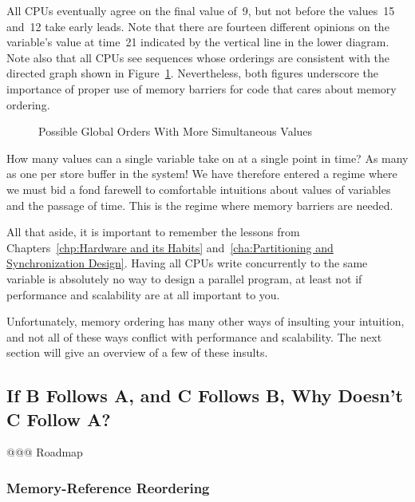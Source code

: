 All CPUs eventually agree on the final value of~9, but not before
the values~15 and~12 take early leads.
Note that there are fourteen different opinions on the variable's value
at time~21 indicated by the vertical line in the lower diagram.
Note also that all CPUs see sequences whose orderings are consistent with
the directed graph shown in
Figure~\ref{fig:advsync:Possible Global Orders With More Simultaneous Values}.
Nevertheless, both figures underscore the importance of
proper use of memory barriers for code that cares about memory ordering.

\begin{figure}[htb]
\centering
{}
\caption{Possible Global Orders With More Simultaneous Values}
\label{fig:advsync:Possible Global Orders With More Simultaneous Values}
\end{figure}

How many values can a single variable take on at a single point in
time?
As many as one per store buffer in the system!
We have therefore entered a regime where we must bid a fond farewell to
comfortable intuitions about values of variables and the passage of time.
This is the regime where memory barriers are needed.

All that aside, it is important to remember the lessons from
Chapters~\ref{chp:Hardware and its Habits}
and~\ref{cha:Partitioning and Synchronization Design}.
Having all CPUs write concurrently to the same variable
is absolutely no way to design a parallel program, at least
not if performance and scalability are at all important to you.

Unfortunately, memory ordering has many other ways of insulting your
intuition, and not all of these ways conflict with performance and
scalability.
The next section will give an overview of a few of these insults.

\subsection{If B Follows A, and C Follows B, Why Doesn't C Follow A?}
\label{sec:advsync:If B Follows A, and C Follows B, Why Doesn't C Follow A?}

@@@ Roadmap

\subsubsection{Memory-Reference Reordering}
\label{sec:advsync:Memory-Reference Reordering}

